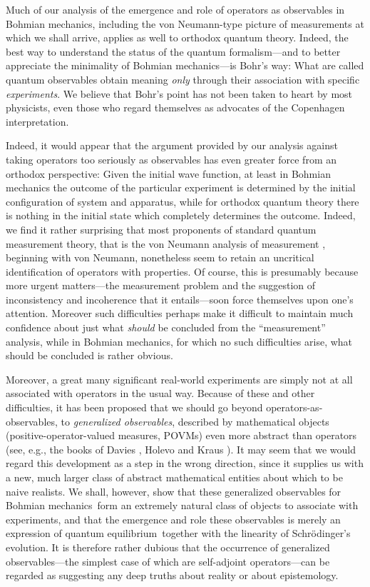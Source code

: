 \documentclass[12pt]{article}
\newcommand{\Sc}{Schr\"{o}dinger}
\newcommand{\sa}{self-adjoint}
\newcommand{\BM}{Bohmian mechanics}
\newcommand{\qt}{quantum theory}
\newcommand{\wf}{wave function}
\newcommand{\qe}{quantum equilibrium}
\begin{document}
Much of our analysis of the emergence and role of operators as
observables in \BM{}, including the von Neumann-type picture of
measurements at which we shall arrive, applies as well to orthodox
\qt{}.  Indeed, the best way to understand the status of the quantum
formalism---and to better appreciate the minimality of Bohmian
mechanics---is Bohr's way: What are called quantum observables obtain
meaning \emph{only} through their association with specific
\emph{experiments}.  We believe that Bohr's point has not been taken
to heart by most physicists, even those who regard themselves as
advocates of the Copenhagen interpretation.


Indeed, it would appear that the argument provided by our analysis
against taking operators too seriously as observables has even greater
force {}from an orthodox perspective: Given the initial \wf{}, at
least in \BM{} the outcome of the particular experiment is determined
by the initial configuration of system and apparatus, while for
orthodox quantum theory there is nothing in the initial state which
completely determines the outcome.  Indeed, we find it rather
surprising that most proponents of standard quantum measurement
theory, that is the von Neumann analysis of measurement \cite{vNe55},
beginning with von Neumann, nonetheless seem to retain an uncritical
identification of operators with properties.  Of course, this is
presumably because more urgent matters---the measurement problem and
the suggestion of inconsistency and incoherence that it entails---soon
force themselves upon one's attention.  Moreover such difficulties
perhaps make it difficult to maintain much confidence about just what
{\it should\/} be concluded {}from the ``measurement'' analysis, while
in \BM, for which no such difficulties arise, what should be concluded
is rather obvious.

Moreover, a great many significant real-world experiments are simply
not at all associated with operators in the usual way.  Because of
these and other difficulties, it has been proposed that we should go
beyond operators-as-observables, to {\it generalized observables\/},
described by mathematical objects (positive-operator-valued measures,
POVMs) even more abstract than operators (see, e.g., the books of
Davies \cite{Dav76}, Holevo \cite{Hol82} and Kraus \cite{Kra83}).  It
may seem that we would regard this development as a step in the wrong
direction, since it supplies us with a new, much larger class of
abstract mathematical entities about which to be naive realists.  We
shall, however, show that these generalized observables for \BM\ form
an extremely natural class of objects to associate with experiments,
and that the emergence and role these observables is merely an
expression of \qe\ together with the linearity of \Sc's evolution.  It
is therefore rather dubious that the occurrence of generalized
observables---the simplest case of which are \sa{} operators---can be
regarded as suggesting any deep truths about reality or about
epistemology.
\end{document}
